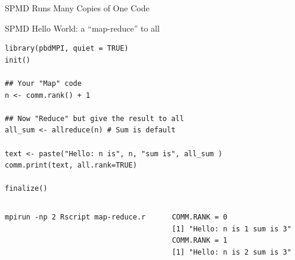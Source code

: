 




\begin{frame}[fragile]{SPMD Runs Many Copies of One Code}
  \begin{exampleblock}{SPMD Hello World: a ``map-reduce'' to all}
    \vspace{-1.5ex}
    \centering
    \begin{lstlisting}[title=map-reduce.r]
library(pbdMPI, quiet = TRUE)
init()

## Your "Map" code
n <- comm.rank() + 1

## Now "Reduce" but give the result to all
all_sum <- allreduce(n) # Sum is default

text <- paste("Hello: n is", n, "sum is", all_sum )
comm.print(text, all.rank=TRUE)

finalize()
    \end{lstlisting}
    \vspace{-4.5ex}
    \begin{columns}[t,onlytextwidth]
      \begin{column}{0.54\textwidth}
        \begin{lstlisting}[backgroundcolor=\color{white},keywordstyle=\color{black},
title=Execute this batch script via:]
mpirun -np 2 Rscript map-reduce.r
        \end{lstlisting}
      \end{column}
      \hfill
      \begin{column}{0.46\textwidth}
        \begin{lstlisting}[title=Output:]
COMM.RANK = 0
[1] "Hello: n is 1 sum is 3"
COMM.RANK = 1
[1] "Hello: n is 2 sum is 3"
        \end{lstlisting}
      \end{column}
    \end{columns}
  \end{exampleblock}
\end{frame}

